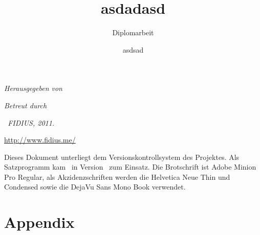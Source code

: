 \documentclass{thesis}
\author{asdsad}
\title{asdadasd}
\subtitle{Diplomarbeit}
\begin{document}
\maketitle

\clearpage
\thispagestyle{empty}\small
\textit{Herausgegeben von}

\textit{Betreut durch}


\vfill

\textit{\textcopyright\ FIDIUS, 2011.}

\url{http://www.fidius.me/}

Dieses Dokument unterliegt dem Versionskontrollsystem des Projektes. Als
Satzprogramm kam \XeTeX\ in Version \the\XeTeXversion\XeTeXrevision\ zum
Einsatz. Die Brotschrift ist Adobe Minion Pro Regular, als Akzidenzschriften
werden die Helvetica Neue Thin und Condensed sowie die DejaVu Sans Mono Book
verwendet.

\normalsize
\frontmatter
\shorttoc

\cleardoublepage
{}
{}
\tableofcontents


\cleardoublepage

%
%

\mainmatter


%
%

\appendix
\chapter{Appendix}

\end{document}
